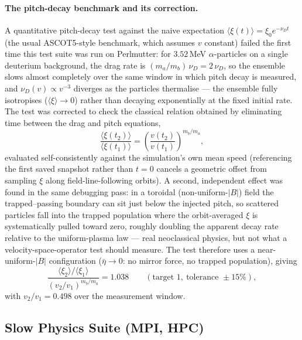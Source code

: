 \documentclass[11pt]{article}
\begin{document}
\paragraph{The pitch-decay benchmark and its correction.}
A quantitative pitch-decay test against the naive expectation
$\langle\xi(t)\rangle=\xi_0 e^{-\nu_D t}$ (the usual ASCOT5-style benchmark,
which assumes $v$ constant) failed the first time this test suite was run
on Perlmutter: for $3.52$\,MeV $\alpha$-particles on a single deuterium
background, the drag rate is $(m_a/m_b)\,\nu_D = 2\,\nu_D$, so the ensemble
slows almost completely over the same window in which pitch decay is
measured, and $\nu_D(v)\propto v^{-3}$ diverges as the particles thermalise
--- the ensemble fully isotropises ($\langle\xi\rangle\to 0$) rather than
decaying exponentially at the fixed initial rate.  The test was corrected to
check the classical relation obtained by eliminating time between the drag
and pitch equations,
\begin{equation}
  \frac{\langle\xi(t_2)\rangle}{\langle\xi(t_1)\rangle}
  = \left(\frac{v(t_2)}{v(t_1)}\right)^{m_b/m_a},
\end{equation}
evaluated self-consistently against the simulation's own mean speed
(referencing the first saved snapshot rather than $t=0$ cancels a
geometric offset from sampling $\xi$ along field-line-following orbits).  A
second, independent effect was found in the same debugging pass: in a
toroidal (non-uniform-$|B|$) field the trapped--passing boundary can sit
just below the injected pitch, so scattered particles fall into the
trapped population where the orbit-averaged $\xi$ is systematically pulled
toward zero, roughly doubling the apparent decay rate relative to the
uniform-plasma law --- real neoclassical physics, but not what a
velocity-space-operator test should measure.  The test therefore uses a
near-uniform-$|B|$ configuration ($\bar\eta\to 0$: no mirror force, no
trapped population), giving
\begin{equation*}
  \frac{\langle\xi_2\rangle/\langle\xi_1\rangle}
       {(v_2/v_1)^{m_b/m_a}} = 1.038
  \qquad(\text{target } 1,\ \text{tolerance } \pm 15\%),
\end{equation*}
with $v_2/v_1 = 0.498$ over the measurement window.

\subsection{Slow Physics Suite (MPI, HPC)}
\end{document}
